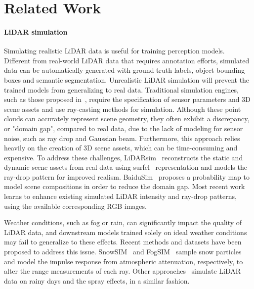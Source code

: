 \section{Related Work}
\label{sec:relwork}
\paragraph{LiDAR simulation}
Simulating realistic LiDAR data is useful for training perception models. Different from real-world LiDAR data that requires annotation efforts, simulated data can be automatically generated with ground truth labels, \eg object bounding boxes and semantic segmentation. Unrealistic LiDAR simulation will prevent the trained models from generalizing to real data.   %
Traditional simulation engines, such as those proposed in~\cite{dosovitskiy2017carla,koenig2004design}, require the specification of sensor parameters and 3D scene assets and use ray-casting methods for simulation. 
 Although these point clouds can accurately represent scene geometry, they often exhibit a discrepancy, or "domain gap", compared to real data, due to the lack of modeling for sensor noise, such as ray drop and Gaussian beam. 
Furthermore, this approach relies heavily on the creation of 3D scene assets, which can be time-consuming and expensive. 
To address these challenges, LiDARsim~\cite{manivasagam2020lidarsim} reconstructs the static and dynamic scene assets from real data using surfel~\cite{pfister2000surfels} representation and models the ray-drop pattern for improved realism. BaiduSim~\cite{baidusim} proposes a probability map to model scene compositions in order to reduce the domain gap. Most recent work~\cite{guillard2022learning} learns to enhance existing simulated LiDAR intensity and ray-drop patterns, using the available corresponding RGB images. 

Weather conditions, such as fog or rain, can significantly impact the quality of LiDAR data, and downstream models trained solely on ideal weather conditions may fail to generalize to these effects. Recent methods and datasets \cite{hahner2021fog,hahner2022lidar,kilic2021lidar,bijelic2020seeing} have been proposed to address this issue. SnowSIM~\cite{hahner2022lidar} and FogSIM~\cite{hahner2021fog} sample snow particles and model the impulse response from atmospheric attenuation, respectively, to alter the range measurements of each ray. Other approaches~\cite{shih2022reconstruction,kilic2021lidar, kurup2021dsor} simulate LiDAR data on rainy days and the spray effects, in a similar fashion.


